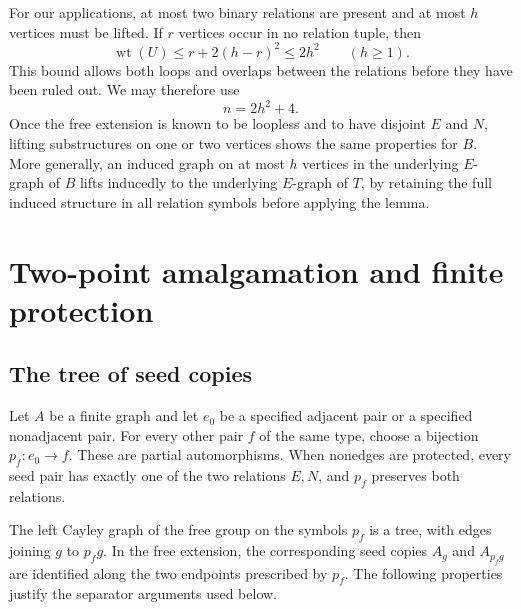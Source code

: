 \documentclass[10pt,a4paper]{amsart}
\newcommand{\wt}{\operatorname{wt}}
\begin{document}
For our applications, at most two binary relations are present and at most $h$ vertices must be lifted. If $r$ vertices occur in no relation tuple, then
\[
 \wt(U)\le r+2(h-r)^2\le 2h^2\qquad(h\ge1).
\]
This bound allows both loops and overlaps between the relations before they have been ruled out. We may therefore use
\begin{equation}\label{eq:weight-bound}
 n=2h^2+4.
\end{equation}
Once the free extension is known to be loopless and to have disjoint $E$ and $N$, lifting substructures on one or two vertices shows the same properties for $B$. More generally, an induced graph on at most $h$ vertices in the underlying $E$-graph of $B$ lifts inducedly to the underlying $E$-graph of $T$, by retaining the full induced structure in all relation symbols before applying the lemma.

\section{Two-point amalgamation and finite protection}\label{sec:criteria}

\subsection{The tree of seed copies}

Let $A$ be a finite graph and let $e_0$ be a specified adjacent pair or a specified nonadjacent pair. For every other pair $f$ of the same type, choose a bijection $p_f:e_0\to f$. These are partial automorphisms. When nonedges are protected, every seed pair has exactly one of the two relations $E,N$, and $p_f$ preserves both relations.

The left Cayley graph of the free group on the symbols $p_f$ is a tree, with edges joining $g$ to $p_fg$. In the free extension, the corresponding seed copies $A_g$ and $A_{p_fg}$ are identified along the two endpoints prescribed by $p_f$. The following properties justify the separator arguments used below.
\end{document}
